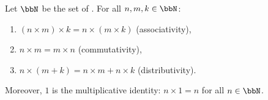 \begin{proposition} \label{proposition:natural_numbers_multiplication_associative_commutative_distributive}
Let $\bbN$ be the set of . For all $n, m, k \in \bbN$:
\begin{enumerate}
    \item $(n \times m) \times k = n \times (m \times k)$ (associativity),
    \item $n \times m = m \times n$ (commutativity),
    \item $n \times (m + k) = n \times m + n \times k$ (distributivity).
\end{enumerate}
Moreover, $1$ is the multiplicative identity: $n \times 1 = n$ for all $n \in \bbN$.
\end{proposition}

